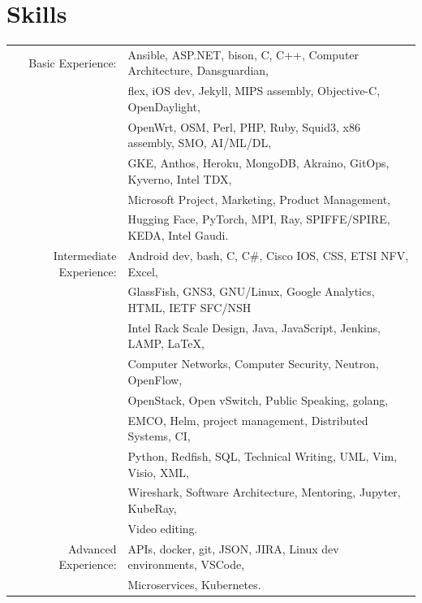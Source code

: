 \documentclass[letter,10pt]{article} %
\begin{document}


\section{Skills}

\begin{tabular}{rl}
	Basic Experience:
	& Ansible, ASP.NET, bison, C, C++, Computer Architecture, Dansguardian,\\
	& flex, iOS dev, Jekyll, MIPS assembly, Objective-C, OpenDaylight,\\
	& OpenWrt, OSM, Perl, PHP, Ruby, Squid3, x86 assembly, SMO, AI/ML/DL,\\
	& GKE, Anthos, Heroku, MongoDB, Akraino, GitOps, Kyverno, Intel TDX,\\
	& Microsoft Project, Marketing, Product Management, \\
	& Hugging Face, PyTorch, MPI, Ray, SPIFFE/SPIRE, KEDA, Intel Gaudi.\\
	Intermediate Experience:
	& Android dev, bash, C, C\#, Cisco IOS, CSS, ETSI NFV, Excel, \\
	& GlassFish, GNS3, GNU/Linux, Google Analytics, HTML, IETF SFC/NSH \\
	& Intel Rack Scale Design, Java, JavaScript, Jenkins, LAMP, {\LaTeX}, \\
	& Computer Networks, Computer Security, Neutron, OpenFlow,\\
	& OpenStack, Open vSwitch, Public Speaking, golang,\\
	& EMCO, Helm, project management, Distributed Systems, CI, \\
	& Python, Redfish, SQL, Technical Writing, UML, Vim, Visio, XML,\\
	& Wireshark, Software Architecture, Mentoring, Jupyter, KubeRay,\\
	& Video editing.\\
	Advanced Experience:
	& APIs, docker, git, JSON, JIRA, Linux dev environments, VSCode,\\
	& Microservices, Kubernetes.
\end{tabular} \\


\end{document}
